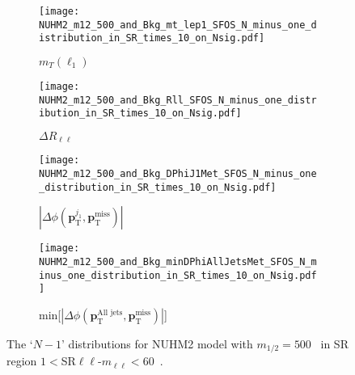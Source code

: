 \begin{figure}[htbp]
    \begin{center}
        \begin{subfigure}[b]{0.48\textwidth}
            \texttt{[image: NUHM2\_m12\_500\_and\_Bkg\_mt\_lep1\_SFOS\_N\_minus\_one\_distribution\_in\_SR\_times\_10\_on\_Nsig.pdf]}
            \caption{$m_{T}(\ell_{1})$}
            \label{fig:event_nuhm2_m12_500_mt_lep1_SFOS}
        \end{subfigure}
        \begin{subfigure}[b]{0.48\textwidth}
            \texttt{[image: NUHM2\_m12\_500\_and\_Bkg\_Rll\_SFOS\_N\_minus\_one\_distribution\_in\_SR\_times\_10\_on\_Nsig.pdf]}
            \caption{$\Delta R_{\ell\ell}$}
            \label{fig:event_nuhm2_m12_500_Rll_SFOS}
        \end{subfigure}
        \begin{subfigure}[b]{0.48\textwidth}
            \texttt{[image: NUHM2\_m12\_500\_and\_Bkg\_DPhiJ1Met\_SFOS\_N\_minus\_one\_distribution\_in\_SR\_times\_10\_on\_Nsig.pdf]}
            \caption{$|\Delta \phi(\mathbf{p}^{j_{1}}_{\mathrm{T}}, \mathbf{p}^{\mathrm{miss}}_{\mathrm{T}})|$}
            \label{fig:event_nuhm2_m12_500_DPhiJ1Met_SFOS}
        \end{subfigure}
        \begin{subfigure}[b]{0.48\textwidth}
            \texttt{[image: NUHM2\_m12\_500\_and\_Bkg\_minDPhiAllJetsMet\_SFOS\_N\_minus\_one\_distribution\_in\_SR\_times\_10\_on\_Nsig.pdf]}
            \caption{min[$|\Delta \phi(\mathbf{p}^{\textrm{All jets}}_{\mathrm{T}}, \mathbf{p}^{\mathrm{miss}}_{\mathrm{T}})|$]}
            \label{fig:event_nuhm2_m12_500_minDPhiAllJetsMet_SFOS}
        \end{subfigure}
    \end{center}
    \caption{The `$N-1$' distributions for NUHM2 model with $m_{1/2} = 500$~{\GeV} in SR region $1 < $SR$\ell \ell$-$m_{\ell \ell} < 60$~{\GeV}.
}
\end{figure}
